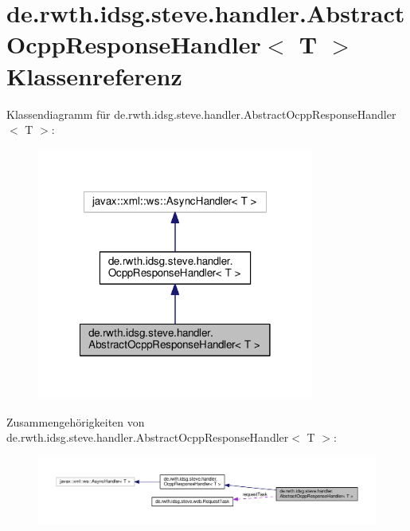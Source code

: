 \hypertarget{classde_1_1rwth_1_1idsg_1_1steve_1_1handler_1_1_abstract_ocpp_response_handler_3_01_t_01_4}{\section{de.\-rwth.\-idsg.\-steve.\-handler.\-Abstract\-Ocpp\-Response\-Handler$<$ T $>$ Klassenreferenz}
\label{classde_1_1rwth_1_1idsg_1_1steve_1_1handler_1_1_abstract_ocpp_response_handler_3_01_t_01_4}
}


Klassendiagramm für de.\-rwth.\-idsg.\-steve.\-handler.\-Abstract\-Ocpp\-Response\-Handler$<$ T $>$\-:
\nopagebreak
\begin{figure}[H]
\begin{center}
\leavevmode
\includegraphics[width=258pt]{classde_1_1rwth_1_1idsg_1_1steve_1_1handler_1_1_abstract_ocpp_response_handler_3_01_t_01_4__inherit__graph}
\end{center}
\end{figure}


Zusammengehörigkeiten von de.\-rwth.\-idsg.\-steve.\-handler.\-Abstract\-Ocpp\-Response\-Handler$<$ T $>$\-:
\nopagebreak
\begin{figure}[H]
\begin{center}
\leavevmode
\includegraphics[width=350pt]{classde_1_1rwth_1_1idsg_1_1steve_1_1handler_1_1_abstract_ocpp_response_handler_3_01_t_01_4__coll__graph}
\end{center}
\end{figure}
